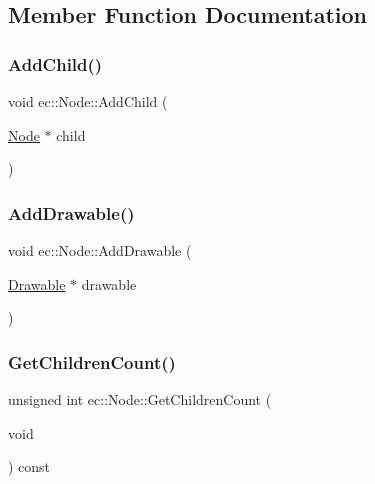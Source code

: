 \subsection{Member Function Documentation}
\mbox{\label{classec_1_1_node_a769243d9432b14a0c4362c98f4c89a73}} 
\subsubsection{\texorpdfstring{Add\+Child()}{AddChild()}}
{\footnotesize\ttfamily void ec\+::\+Node\+::\+Add\+Child (\begin{DoxyParamCaption}\item[{\mbox{\hyperlink{classec_1_1_node}{Node}} $\ast$}]{child }\end{DoxyParamCaption})}

\mbox{\label{classec_1_1_node_aee80ae03faf344743ab38944ce3ced5f}} 
\subsubsection{\texorpdfstring{Add\+Drawable()}{AddDrawable()}}
{\footnotesize\ttfamily void ec\+::\+Node\+::\+Add\+Drawable (\begin{DoxyParamCaption}\item[{\mbox{\hyperlink{classec_1_1_drawable}{Drawable}} $\ast$}]{drawable }\end{DoxyParamCaption})}

\mbox{\label{classec_1_1_node_afc08689badadadcbbca919858994d30b}} 
\subsubsection{\texorpdfstring{Get\+Children\+Count()}{GetChildrenCount()}}
{\footnotesize\ttfamily unsigned int ec\+::\+Node\+::\+Get\+Children\+Count (\begin{DoxyParamCaption}\item[{void}]{ }\end{DoxyParamCaption}) const}

